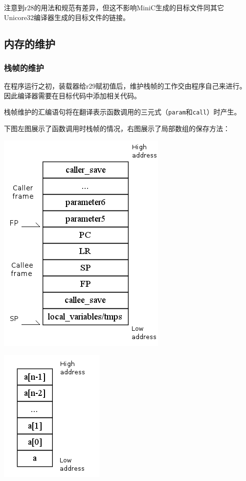 注意到r28的用法和规范有差异，但这不影响MiniC生成的目标文件同其它Unicore32编译器生成的目标文件的链接。
\subsection{内存的维护}
\subsubsection{栈帧的维护}
在程序运行之初，装载器给r29赋初值后，维护栈帧的工作交由程序自己来进行。因此编译器需要在目标代码中添加相关代码。

栈帧维护的汇编语句将在翻译表示函数调用的三元式（\verb|param|和\verb|call|）时产生。

下图左图展示了函数调用时栈帧的情况，右图展示了局部数组的保存方法：
\begin{center}

\begin{minipage}{0.4\textwidth}
\begin{center}
	\includegraphics[scale=0.6]{stack_frame.png}
	\label{fig:stackframe}
\end{center}
\end{minipage}
\begin{minipage}{0.4\textwidth}
\begin{center}
	\includegraphics[scale=0.6]{local_array.png}
	\label{fig:localarray}
\end{center}
\end{minipage}
\end{center}
